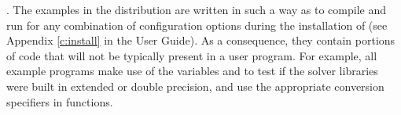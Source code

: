 \vspace{0.2in}. 
The examples in the {\ida} distribution are written in such a way as
to compile and run for any combination of configuration options during the
installation of {\sundials} (see Appendix \ref{c:install} in the User Guide).
As a consequence, they contain portions of code that will not be typically present in a
user program. For example, all example programs make use of the
variables  and 
to test if the solver libraries were built in extended or double precision,
and use the appropriate conversion specifiers in  functions.
